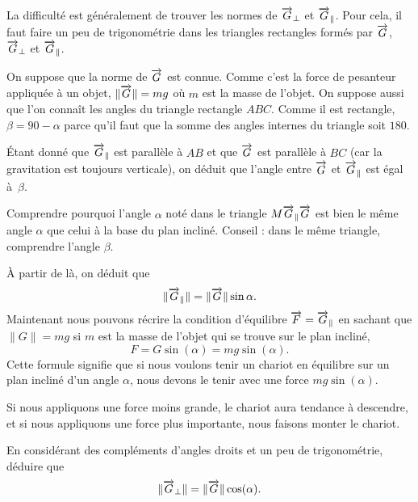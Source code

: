 La difficulté est généralement de trouver les normes de $\overrightarrow{G}_{\perp}$ et $\overrightarrow{G}_{\parallel}$. Pour cela, il faut faire un peu de trigonométrie dans les triangles rectangles formés par $\overrightarrow{G}$, $\overrightarrow{G}_{\perp}$ et $\overrightarrow{G}_{\parallel}$. 

On suppose que la norme de $\overrightarrow{G}$ est connue. Comme c'est la force de pesanteur appliquée à un objet, $\| \overrightarrow{G} \|=mg$ où $m$ est la masse de l'objet. On suppose aussi que l'on connaît les angles du triangle rectangle $ABC$. Comme il est rectangle, $\beta=90-\alpha$ parce qu'il faut que la somme des angles internes du triangle soit $180$.

Étant donné que $\overrightarrow{G}_{\parallel}$ est parallèle à $AB$ et que $\overrightarrow{G}$ est parallèle à $BC$ (car la gravitation est toujours verticale), on déduit que l'angle entre $\overrightarrow{G}$ et $\overrightarrow{G}_{\parallel}$ est égal à~$\beta$.

\begin{exercice}
Comprendre pourquoi l'angle $\alpha$ noté dans le triangle $M\overrightarrow{G}_{\parallel}\overrightarrow{G}$ est bien le même angle $\alpha$ que celui à la base du plan incliné. Conseil : dans le même triangle, comprendre l'angle $\beta$.
\end{exercice}

À partir de là, on déduit que 
\begin{equation}				\label{eq_Stevinpapa}
	\| \overrightarrow{G}_{\parallel} \|=\| \overrightarrow{G} \|\sin\alpha.
\end{equation}
Maintenant nous pouvons récrire la condition d'équilibre $\overrightarrow{F}=\overrightarrow{G}_{\parallel}$ en sachant que $\| G \|=mg$ si $m$ est la masse de l'objet qui se trouve sur le plan incliné,
\begin{equation}			\label{EqConditionEquilibrePlanIncl}
	F=G\sin(\alpha)=mg\sin(\alpha).
\end{equation}
Cette formule signifie que si nous voulons tenir un chariot en équilibre sur un plan incliné d'un angle $\alpha$, nous devons le tenir avec une force $mg\sin(\alpha)$.

Si nous appliquons une force moins grande, le chariot aura tendance à descendre, et si nous appliquons une force plus importante, nous faisons monter le chariot.

\begin{exercice}
En considérant des compléments d'angles droits et un peu de trigonométrie, déduire que
\[ 
	\| \overrightarrow{G}_{\perp} \|=\| \overrightarrow{G} \|\cos(\alpha).
\]
\end{exercice}


